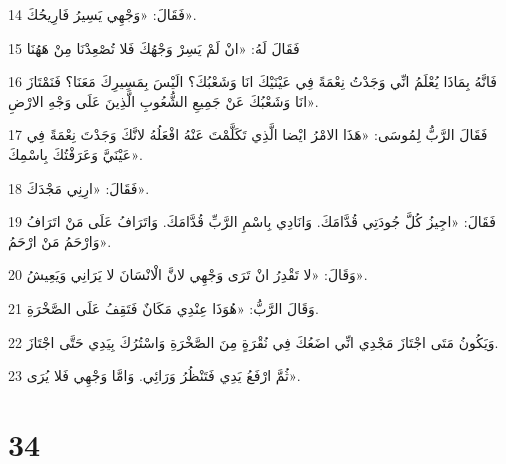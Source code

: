 \par 14 فَقَالَ: «وَجْهِي يَسِيرُ فَارِيحُكَ».
\par 15 فَقَالَ لَهُ: «انْ لَمْ يَسِرْ وَجْهُكَ فَلا تُصْعِدْنَا مِنْ هَهُنَا
\par 16 فَانَّهُ بِمَاذَا يُعْلَمُ انِّي وَجَدْتُ نِعْمَةً فِي عَيْنَيْكَ انَا وَشَعْبُكَ؟ الَيْسَ بِمَسِيرِكَ مَعَنَا؟ فَنَمْتَازَ انَا وَشَعْبُكَ عَنْ جَمِيعِ الشُّعُوبِ الَّذِينَ عَلَى وَجْهِ الارْضِ».
\par 17 فَقَالَ الرَّبُّ لِمُوسَى: «هَذَا الامْرُ ايْضا الَّذِي تَكَلَّمْتَ عَنْهُ افْعَلُهُ لانَّكَ وَجَدْتَ نِعْمَةً فِي عَيْنَيَّ وَعَرَفْتُكَ بِاسْمِكَ».
\par 18 فَقَالَ: «ارِنِي مَجْدَكَ».
\par 19 فَقَالَ: «اجِيزُ كُلَّ جُودَتِي قُدَّامَكَ. وَانَادِي بِاسْمِ الرَّبِّ قُدَّامَكَ. وَاتَرَافُ عَلَى مَنْ اتَرَافُ وَارْحَمُ مَنْ ارْحَمُ».
\par 20 وَقَالَ: «لا تَقْدِرُ انْ تَرَى وَجْهِي لانَّ الْانْسَانَ لا يَرَانِي وَيَعِيشُ».
\par 21 وَقَالَ الرَّبُّ: «هُوَذَا عِنْدِي مَكَانٌ فَتَقِفُ عَلَى الصَّخْرَةِ.
\par 22 وَيَكُونُ مَتَى اجْتَازَ مَجْدِي انِّي اضَعُكَ فِي نُقْرَةٍ مِنَ الصَّخْرَةِ وَاسْتُرُكَ بِيَدِي حَتَّى اجْتَازَ.
\par 23 ثُمَّ ارْفَعُ يَدِي فَتَنْظُرُ وَرَائِي. وَامَّا وَجْهِي فَلا يُرَى».

\chapter{34}

